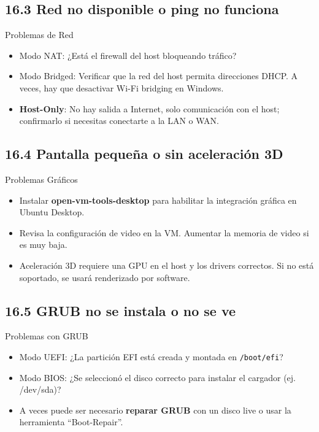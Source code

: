 \documentclass{beamer}
\begin{document}
\subsection{16.3 Red no disponible o ping no funciona}
\begin{frame}{Problemas de Red}
	\begin{itemize}
		\item Modo NAT: ¿Está el firewall del host bloqueando tráfico?
		\item Modo Bridged: Verificar que la red del host permita direcciones DHCP. A veces, hay que desactivar Wi-Fi bridging en Windows.
		\item \textbf{Host-Only}: No hay salida a Internet, solo comunicación con el host; confirmarlo si necesitas conectarte a la LAN o WAN.
	\end{itemize}
\end{frame}

\subsection{16.4 Pantalla pequeña o sin aceleración 3D}
\begin{frame}{Problemas Gráficos}
	\begin{itemize}
		\item Instalar \textbf{open-vm-tools-desktop} para habilitar la integración gráfica en Ubuntu Desktop.
		\item Revisa la configuración de video en la VM. Aumentar la memoria de video si es muy baja.
		\item Aceleración 3D requiere una GPU en el host y los drivers correctos. Si no está soportado, se usará renderizado por software.
	\end{itemize}
\end{frame}

\subsection{16.5 GRUB no se instala o no se ve}
\begin{frame}{Problemas con GRUB}
	\begin{itemize}
		\item Modo UEFI: ¿La partición EFI está creada y montada en \texttt{/boot/efi}?
		\item Modo BIOS: ¿Se seleccionó el disco correcto para instalar el cargador (ej. /dev/sda)?
		\item A veces puede ser necesario \textbf{reparar GRUB} con un disco live o usar la herramienta “Boot-Repair”.
	\end{itemize}
\end{frame}
\end{document}
